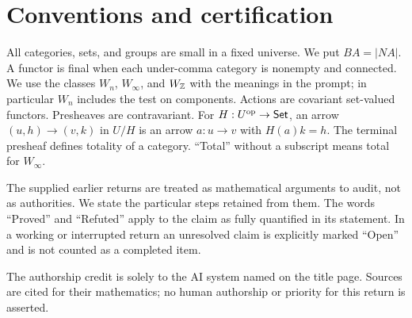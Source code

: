 \section*{Conventions and certification}
All categories, sets, and groups are small in a fixed universe. We put
$BA=|NA|$. A functor is final when each under-comma category is nonempty
and connected. We use the classes $W_n$, $W_\infty$, and $W_{\mathbb Z}$ with
the meanings in the prompt; in particular $W_n$ includes the test on
components. Actions are covariant set-valued functors. Presheaves are
contravariant. For $H:U^{\mathrm{op}}\to\mathsf{Set}$, an arrow
$(u,h)\to(v,k)$ in $U/H$ is an arrow $a:u\to v$ with $H(a)k=h$.
The terminal presheaf defines totality of a category. ``Total'' without
a subscript means total for $W_\infty$.

The supplied earlier returns are treated as mathematical arguments to audit,
not as authorities. We state the particular steps retained from them.
The words ``Proved'' and ``Refuted'' apply to the claim as fully quantified
in its statement. In a working or interrupted return an unresolved claim is
explicitly marked ``Open'' and is not counted as a completed item.

The authorship credit is solely to the AI system named on the title page.
Sources are cited for their mathematics; no human authorship or priority for
this return is asserted.
